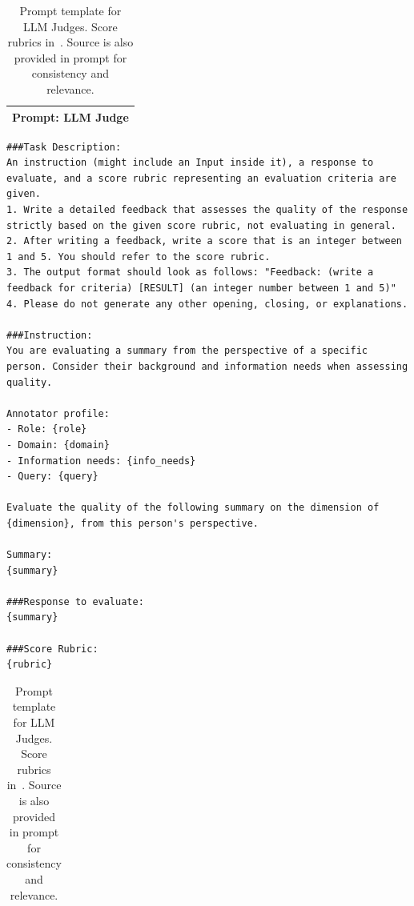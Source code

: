 \begin{table}[h]
\centering
\footnotesize
\begin{tabular}{p{}}
\toprule
\textbf{Prompt: LLM Judge} \\
\midrule
\end{tabular}
\begin{lstlisting}[style=promptstyle]
###Task Description:
An instruction (might include an Input inside it), a response to evaluate, and a score rubric representing an evaluation criteria are given.
1. Write a detailed feedback that assesses the quality of the response strictly based on the given score rubric, not evaluating in general.
2. After writing a feedback, write a score that is an integer between 1 and 5. You should refer to the score rubric.
3. The output format should look as follows: "Feedback: (write a feedback for criteria) [RESULT] (an integer number between 1 and 5)"
4. Please do not generate any other opening, closing, or explanations.

###Instruction:
You are evaluating a summary from the perspective of a specific person. Consider their background and information needs when assessing quality.

Annotator profile:
- Role: {role}
- Domain: {domain}
- Information needs: {info_needs}
- Query: {query}

Evaluate the quality of the following summary on the dimension of {dimension}, from this person's perspective.

Summary:
{summary}

###Response to evaluate:
{summary}

###Score Rubric:
{rubric}
\end{lstlisting}
\begin{tabular}{p{\textwidth}}
\bottomrule
\end{tabular}
\caption[Prompt template for LLM Judges.]{Prompt template for LLM Judges. Score rubrics in~. Source is also provided in prompt for consistency and relevance.}\label{tab:ch-7-prompt-llm-judge}
\end{table}

